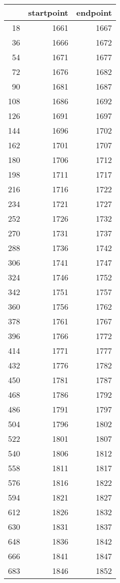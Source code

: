 % 
\begin{tabular}{rrr}
  \hline
 & startpoint & endpoint \\ 
  \hline
18 & 1661 & 1667 \\ 
  36 & 1666 & 1672 \\ 
  54 & 1671 & 1677 \\ 
  72 & 1676 & 1682 \\ 
  90 & 1681 & 1687 \\ 
  108 & 1686 & 1692 \\ 
  126 & 1691 & 1697 \\ 
  144 & 1696 & 1702 \\ 
  162 & 1701 & 1707 \\ 
  180 & 1706 & 1712 \\ 
  198 & 1711 & 1717 \\ 
  216 & 1716 & 1722 \\ 
  234 & 1721 & 1727 \\ 
  252 & 1726 & 1732 \\ 
  270 & 1731 & 1737 \\ 
  288 & 1736 & 1742 \\ 
  306 & 1741 & 1747 \\ 
  324 & 1746 & 1752 \\ 
  342 & 1751 & 1757 \\ 
  360 & 1756 & 1762 \\ 
  378 & 1761 & 1767 \\ 
  396 & 1766 & 1772 \\ 
  414 & 1771 & 1777 \\ 
  432 & 1776 & 1782 \\ 
  450 & 1781 & 1787 \\ 
  468 & 1786 & 1792 \\ 
  486 & 1791 & 1797 \\ 
  504 & 1796 & 1802 \\ 
  522 & 1801 & 1807 \\ 
  540 & 1806 & 1812 \\ 
  558 & 1811 & 1817 \\ 
  576 & 1816 & 1822 \\ 
  594 & 1821 & 1827 \\ 
  612 & 1826 & 1832 \\ 
  630 & 1831 & 1837 \\ 
  648 & 1836 & 1842 \\ 
  666 & 1841 & 1847 \\ 
  683 & 1846 & 1852 \\ 

\end{tabular}
